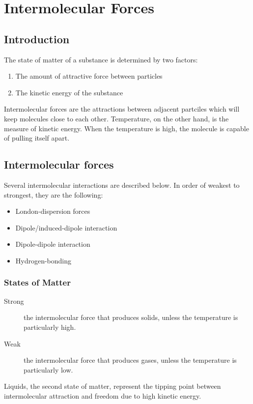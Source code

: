 \chapter{Intermolecular Forces}
\section{Introduction}
The state of matter of a substance is determined by two factors:

\begin{enumerate}
  \item The amount of attractive force between particles
  \item The kinetic energy of the substance
\end{enumerate}

Intermolecular forces are the attractions between adjacent partciles which will
keep molecules close to each other. Temperature, on the other hand, is the
measure of kinetic energy. When the temperature is high, the molecule is
capable of pulling itself apart.

\section{Intermolecular forces}
Several intermolecular interactions are described below. In order of weakest to
strongest, they are the following:
\begin{itemize}
  \item London-dispersion forces
  \item Dipole/induced-dipole interaction
  \item Dipole-dipole interaction
  \item Hydrogen-bonding
\end{itemize}

\subsection{States of Matter}
\begin{description}
  \item[Strong] the intermolecular force that produces solids, unless the
    temperature is particularly high.
  \item[Weak] the intermolecular force that produces gases, unless the
    temperature is particularly low.
\end{description}

Liquids, the second state of matter, represent the tipping point between
intermolecular attraction and freedom due to high kinetic energy.

